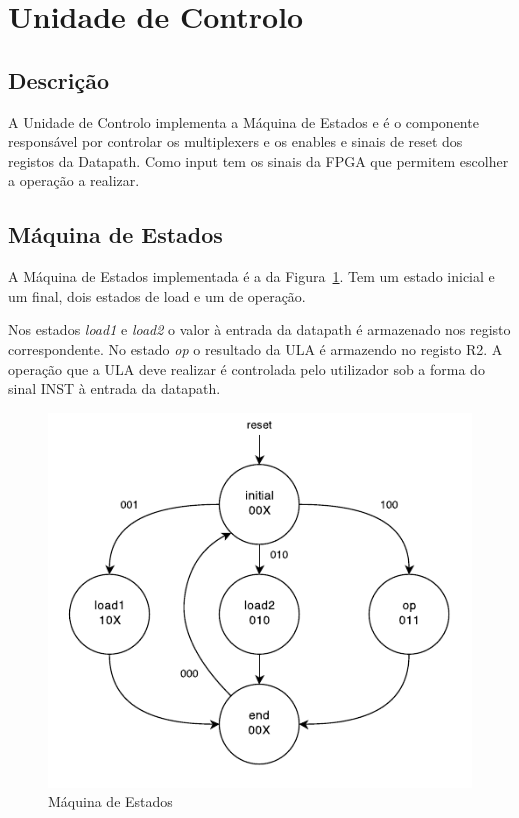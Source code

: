 \documentclass[a4paper]{article}
\begin{document}
\section{Unidade de Controlo}
\subsection{Descrição}
A Unidade de Controlo implementa a Máquina de Estados e é o componente responsável por controlar os multiplexers e os enables e sinais de reset dos registos da Datapath. Como input tem os sinais da FPGA que permitem escolher a operação a realizar.

\subsection{Máquina de Estados}
A Máquina de Estados implementada é a da Figura~\ref{fig:FSMdiagram}. Tem um estado inicial e um final, dois estados de load e um de operação.

Nos estados \textit{load1} e \textit{load2} o valor à entrada da datapath é armazenado nos registo correspondente. No estado \textit{op} o resultado da ULA é armazendo no registo R2. A operação que a ULA deve realizar é controlada pelo utilizador sob a forma do sinal INST à entrada da datapath.

\begin{figure}[h]
	\centering
	\includegraphics[scale=0.28]{FSM}
	\caption{Máquina de Estados}
	\label{fig:FSMdiagram}
\end{figure}
\end{document}
